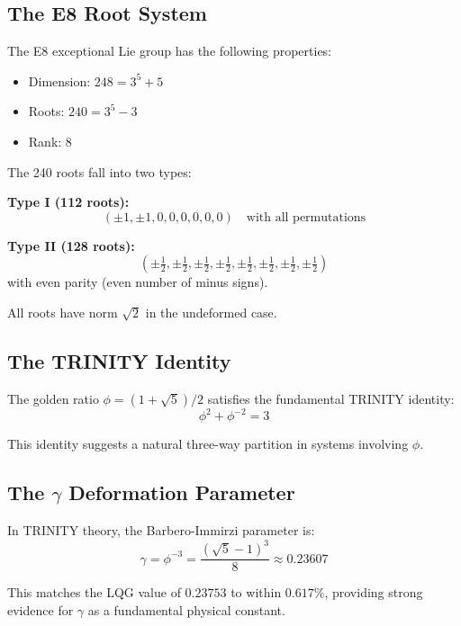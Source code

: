 \documentclass[12pt,a4paper]{article}
\begin{document}
\subsection{The E8 Root System}

The E8 exceptional Lie group has the following properties:
\begin{itemize}
\item Dimension: $248 = 3^5 + 5$
\item Roots: $240 = 3^5 - 3$
\item Rank: $8$
\end{itemize}

The 240 roots fall into two types:

\textbf{Type I (112 roots):}
\begin{equation}
(\pm 1, \pm 1, 0, 0, 0, 0, 0, 0) \quad \text{with all permutations}
\end{equation}

\textbf{Type II (128 roots):}
\begin{equation}
(\pm \tfrac{1}{2}, \pm \tfrac{1}{2}, \pm \tfrac{1}{2}, \pm \tfrac{1}{2}, \pm \tfrac{1}{2}, \pm \tfrac{1}{2}, \pm \tfrac{1}{2}, \pm \tfrac{1}{2})
\end{equation}
with even parity (even number of minus signs).

All roots have norm $\sqrt{2}$ in the undeformed case.

\subsection{The TRINITY Identity}

The golden ratio $\phi = (1+\sqrt{5})/2$ satisfies the fundamental TRINITY identity:
\begin{equation}
\phi^2 + \phi^{-2} = 3
\end{equation}

This identity suggests a natural three-way partition in systems involving $\phi$.

\subsection{The $\gamma$ Deformation Parameter}

In TRINITY theory, the Barbero-Immirzi parameter is:
\begin{equation}
\gamma = \phi^{-3} = \frac{(\sqrt{5}-1)^3}{8} \approx 0.23607
\end{equation}

This matches the LQG value of $0.23753$ to within $0.617\%$, providing strong evidence for $\gamma$ as a fundamental physical constant.
\end{document}
